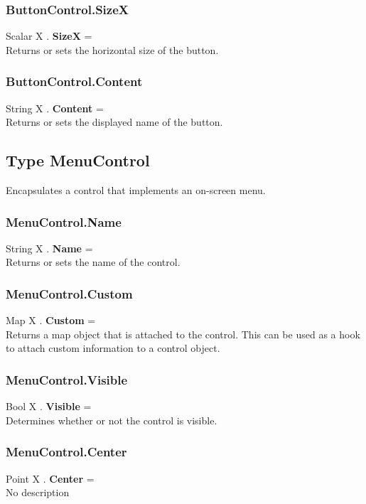 \documentclass[10pt]{book}
\begin{document}
\subsubsection{ButtonControl.SizeX \label{F:ButtonControl:SizeX}}
Scalar X . \textbf{SizeX} = \\
Returns or sets the horizontal size of the button.

\subsubsection{ButtonControl.Content \label{F:ButtonControl:Content}}
String X . \textbf{Content} = \\
Returns or sets the displayed name of the button.

\subsection{Type MenuControl \label{T:MenuControl}}
Encapsulates a control that implements an on-screen menu.

\subsubsection{MenuControl.Name \label{F:MenuControl:Name}}
String X . \textbf{Name} = \\
Returns or sets the name of the control.

\subsubsection{MenuControl.Custom \label{F:MenuControl:Custom}}
Map X . \textbf{Custom} = \\
Returns a map object that is attached to the control. This can be used as a hook to attach custom information to a control object.

\subsubsection{MenuControl.Visible \label{F:MenuControl:Visible}}
Bool X . \textbf{Visible} = \\
Determines whether or not the control is visible.

\subsubsection{MenuControl.Center \label{F:MenuControl:Center}}
Point X . \textbf{Center} = \\
No description
\end{document}
